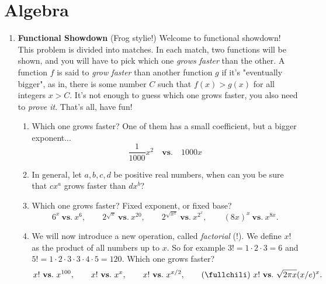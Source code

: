 \documentclass[11pt]{scrartcl}
\begin{document}
\section{Algebra}
\begin{enumerate}[label=\textbf{A\arabic*}.]
    \item \textbf{Functional Showdown} (Frog stylie!) \newline
    Welcome to functional showdown! This problem is divided into matches. In each match, two functions will be shown, and you will have to pick which one \textit{grows faster} than the other. A function $f$ is said to \textit{grow faster} than another function $g$ if it's "eventually bigger", as in, there is some number $C$ such that $f(x) > g(x)$ for all integers $x>C$. \newline
    It's not enough to guess which one grows faster, you also need to \emph{prove it}. That's all, have fun! 
    \begin{enumerate}
        \item Which one grows faster? One of them has a small coefficient, but a bigger exponent...
        $$\frac{1}{1000}x^2 \quad \mathbf{vs.} \quad 1000x$$
        
        \item In general, let $a,b,c,d$ be positive real numbers, when can you be sure that $cx^a$ grows faster than $dx^b$?
        
        \item Which one grows faster? Fixed exponent, or fixed base?
        $$
        6^x \ \mathbf{vs.} \ x^6, \qquad
        2^{\sqrt{x}} \ \mathbf{vs.} \ x^{20}, \qquad
        2^{\sqrt{x^x}} \ \mathbf{vs.} \ x^{2^x}, \qquad
        (8x)^{x} \ \mathbf{vs.} \ x^{8x}.
        $$
        \item We will now introduce a new operation, called \textit{factorial} ($!$). We define $x!$ as the product of all numbers up to $x$. So for example $3! = 1\cdot2\cdot3 = 6$ and $5! = 1\cdot2\cdot3\cdot3\cdot4\cdot5 = 120$.
        Which one grows faster?
        $$
        x! \ \mathbf{vs.} \ x^{100}, \qquad 
        x! \ \mathbf{vs.} \ x^x, \qquad
        x! \ \mathbf{vs.} \ x^{x/2}, \qquad
        (\text{\fullchili})\ x!\ \mathbf{vs.}\ \sqrt{2\pi x}(x/e)^x.
        $$
    \end{enumerate}
\end{enumerate}

\newpage
\end{document}
